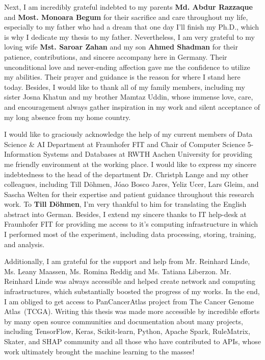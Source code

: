 \begin{acknowledgements}
\hspace*{5mm} Next, I am incredibly grateful indebted to my parents \textbf{Md. Abdur Razzaque} and \textbf{Most. Monoara Begum} for their sacrifice and care throughout my life, especially to my father who had a dream that one day I'll finish my Ph.D., which is why I dedicate my thesis to my father. Nevertheless, I am very grateful to my loving wife \textbf{Mst. Saroar Zahan} and my son \textbf{Ahmed Shadman} for their patience, contributions, and sincere accompany here in Germany. Their unconditional love and never-ending affection gave me the confidence to utilize my abilities. Their prayer and guidance is the reason for where I stand here today. Besides, I would like to thank all of my family members, including my sister Josna Khatun and my brother Mamtaz Uddin, whose immense love, care, and encouragement always gather inspiration in my work and silent acceptance of my long absence from my home country. 

\hspace*{5mm} I would like to graciously acknowledge the help of my current members of Data Science \& AI Department at Fraunhofer FIT and Chair of Computer Science 5- Information Systems and Databases at RWTH Aachen University for providing me friendly environment at the working place. I would like to express my sincere indebtedness to the head of the department Dr. Christph Lange and my other colleagues, including Till D{\"o}hmen, J{\'o}ao Bosco Jares, Yeliz Ucer, Lars Gleim, and Sascha Welten for their expertise and patient guidance throughout this research work. To \textbf{Till D{\"o}hmen}, I'm very thankful to him for translating the English abstract into German. Besides, I extend my sincere thanks to IT help-desk at Fraunhofer FIT for providing me access to it's computing infrastructure in which I performed most of the experiment, including data processing, storing, training, and analysis.

\hspace*{5mm} Additionally, I am grateful for the support and help from Mr. Reinhard Linde, Ms. Leany Maassen, Ms. Romina Reddig and Ms. Tatiana Liberzon. Mr. Reinhard Linde was always accessible and helped create network and computing infrastructures, which substantially boosted the progress of my works. In the end, I am obliged to get access to PanCancerAtlas project from The Cancer Genome Atlas~(TCGA). Writing this thesis was made more accessible by incredible efforts by many open source communities and documentation about many projects, including TensorFlow, Keras, Scikit-learn, Python, Apache Spark, RuleMatrix, Skater, and SHAP community and all those who have contributed to APIs, whose work ultimately brought the machine learning to the masses!


\end{acknowledgements}
